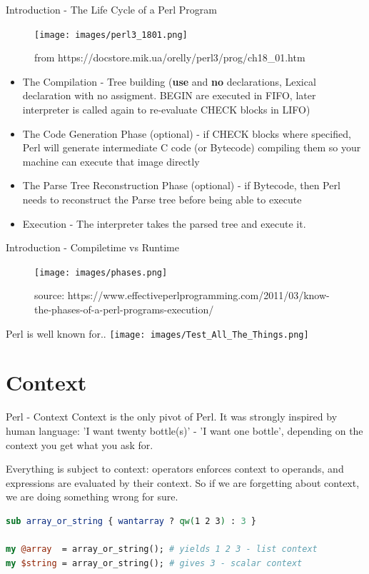 \documentclass[10pt]{beamer}
\begin{document}
\begin{frame}[fragile]{Introduction - The Life Cycle of a Perl Program}
\begin{figure}
    \centering
    \texttt{[image: images/perl3\_1801.png]}
    \caption{from https://docstore.mik.ua/orelly/perl3/prog/ch18\_01.htm}
\end{figure}
\vspace{-0.4cm}
\begin{itemize}
\item  The Compilation - Tree building (\textbf{use} and \textbf{no} declarations, Lexical declaration with no assigment. BEGIN are executed in FIFO, later interpreter is called again to re-evaluate CHECK blocks in LIFO)
\item   The Code Generation Phase (optional) - if CHECK blocks where specified, Perl will generate intermediate C code (or Bytecode) compiling them so your machine can execute that image directly
\item  The Parse Tree Reconstruction Phase (optional) - if Bytecode, then Perl needs to reconstruct the Parse tree before being able to execute
\item Execution - The interpreter takes the parsed tree and execute it.

\end{itemize}
\end{frame}


\begin{frame}[fragile]{Introduction - Compiletime vs Runtime}
\begin{figure}
    \centering
    \texttt{[image: images/phases.png]}
    \caption{source: https://www.effectiveperlprogramming.com/2011/03/know-the-phases-of-a-perl-programs-execution/}
\end{figure}

\end{frame}


\begin{frame}{Perl is well known for..}
    \center \texttt{[image: images/Test\_All\_The\_Things.png]}
\end{frame}


\section{Context}

\begin{frame}[fragile]{Perl - Context}
Context is the only pivot of Perl. It was strongly inspired by human language: 'I want twenty bottle(s)' - 'I want one bottle', depending on the context you get what you ask for.

Everything is subject to context: operators enforces context to operands, and expressions are evaluated by their context. So if we are forgetting about context, we are doing something wrong for sure.
\begin{lstlisting}[language=perl]
sub array_or_string { wantarray ? qw(1 2 3) : 3 }

my @array  = array_or_string(); # yields 1 2 3 - list context
my $string = array_or_string(); # gives 3 - scalar context
\end{lstlisting}

\end{frame}
\end{document}
